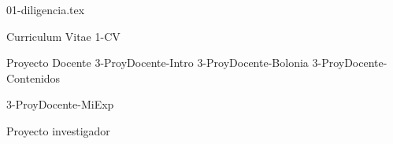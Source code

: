 \documentclass[12pt,a4paper,oneside]{luciathesis}
\begin{document}
	

	 {01-diligencia.tex}



       \setlength{\parskip}{0ex plus0.2ex minus0.2ex}
       \renewcommand{\baselinestretch}{1} \small\normalsize
       \tableofcontents
       \renewcommand{\baselinestretch}{1.2} \small\normalsize


       \setlength{\parskip}{0.8ex plus0.2ex minus0.2ex}


\pagestyle{fancy}
\clearpage
{}


   \fancyhf{}
   \rhead{\thepage}	
   \cfoot{}	
   \begin{part}{Curriculum Vitae} \label{CV}
      {1-CV}
   \end{part}

  \setcounter{chapter}{0}
 \begin{part}{Proyecto Docente} \label{PD}
   \fancyhf{}
   \rhead{\thepage}
   \cfoot{}
      {3-ProyDocente-Intro}
      {3-ProyDocente-Bolonia}
      {3-ProyDocente-Contenidos}
     
     
      {3-ProyDocente-MiExp}
   \end{part}
  \setcounter{chapter}{0}
  \begin{part}{Proyecto investigador} \label{PI}
   \fancyhf{}
   \rhead{\thepage}
   \cfoot{}
	
        
	
   \end{part}
\end{document}
